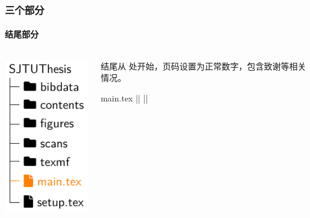\begin{frame}[fragile]
  \frametitle{三个部分}
  \framesubtitle{结尾部分}
  \begin{columns}
    \begin{column}{0.4\textwidth}
      \includegraphics[page=9]{support/figures/thesisdir.pdf}
    \end{column}
    \begin{column}{0.6\textwidth}
      结尾从  处开始，页码设置为正常数字，包含致谢等相关情况。
      \begin{codeblock}[firstnumber=71]{main.tex}
|\highlightline|%
|\highlightline|\backmatter






      \end{codeblock}
    \end{column}
  \end{columns}
\end{frame}

